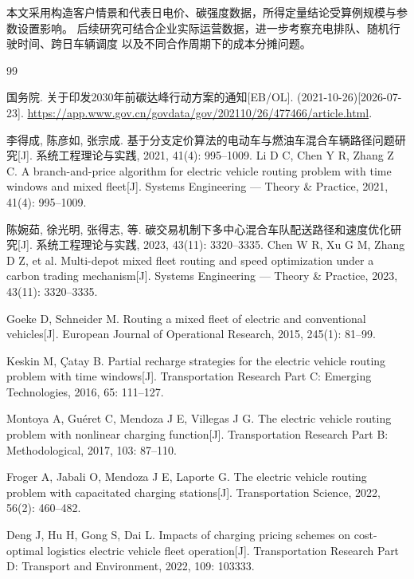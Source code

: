 \documentclass{setp-new}
\begin{document}
本文采用构造客户情景和代表日电价、碳强度数据，所得定量结论受算例规模与参数设置影响。
后续研究可结合企业实际运营数据，进一步考察充电排队、随机行驶时间、跨日车辆调度
以及不同合作周期下的成本分摊问题。

\begin{thebibliography}{99}

 国务院. 关于印发2030年前碳达峰行动方案的通知[EB/OL]. (2021-10-26)[2026-07-23].
\url{https://app.www.gov.cn/govdata/gov/202110/26/477466/article.html}.


 李得成, 陈彦如, 张宗成. 基于分支定价算法的电动车与燃油车混合车辆路径问题研究[J]. 系统工程理论与实践, 2021, 41(4): 995--1009.\newline
Li D C, Chen Y R, Zhang Z C. A branch-and-price algorithm for electric vehicle routing problem with time windows and mixed fleet[J]. Systems Engineering --- Theory \& Practice, 2021, 41(4): 995--1009.


 陈婉茹, 徐光明, 张得志, 等. 碳交易机制下多中心混合车队配送路径和速度优化研究[J]. 系统工程理论与实践, 2023, 43(11): 3320--3335.\newline
Chen W R, Xu G M, Zhang D Z, et al. Multi-depot mixed fleet routing and speed optimization under a carbon trading mechanism[J]. Systems Engineering --- Theory \& Practice, 2023, 43(11): 3320--3335.


 Goeke D, Schneider M. Routing a mixed fleet of electric and conventional vehicles[J]. European Journal of Operational Research, 2015, 245(1): 81--99.


 Keskin M, \c{C}atay B. Partial recharge strategies for the electric vehicle routing problem with time windows[J]. Transportation Research Part C: Emerging Technologies, 2016, 65: 111--127.


 Montoya A, Guéret C, Mendoza J E, Villegas J G. The electric vehicle routing problem with nonlinear charging function[J]. Transportation Research Part B: Methodological, 2017, 103: 87--110.

 Froger A, Jabali O, Mendoza J E, Laporte G. The electric vehicle routing problem with capacitated charging stations[J]. Transportation Science, 2022, 56(2): 460--482.


 Deng J, Hu H, Gong S, Dai L. Impacts of charging pricing schemes on cost-optimal logistics electric vehicle fleet operation[J]. Transportation Research Part D: Transport and Environment, 2022, 109: 103333.


\end{thebibliography}
\end{document}
